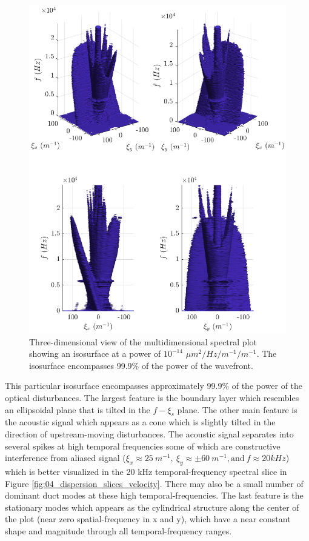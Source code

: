 \begin{figure}
  \centering
  \includegraphics{../matlab/04_dispersion_analysis/dispersion_3d.eps}
  \caption{Three-dimensional view of the multidimensional spectral plot showing an isosurface at a power of $10^{-14}$ $\mu m^2/Hz/m^{-1}/m^{-1}$. The isosurface encompasses 99.9\% of the power of the wavefront.}
  \label{fig:04_dispersion_3d}
\end{figure}
This particular isosurface encompasses approximately 99.9\% of the power of the optical disturbances.
The largest feature is the boundary layer which resembles an ellipsoidal plane that is tilted in the $f-\xi_s$ plane.
The other main feature is the acoustic signal which appears as a cone which is slightly tilted in the direction of upstream-moving disturbances.
The acoustic signal separates into several spikes at high temporal frequencies some of which are constructive interference from aliased signal ($\xi_x\approx25\ m^{-1},\ \xi_y\approx\pm60\ m^{-1}, \textrm{and}\ f\approx20 kHz$) which is better visualized in the 20 kHz temporal-frequency spectral slice in Figure \ref{fig:04_dispersion_slices_velocity}.
There may also be a small number of dominant duct modes at these high temporal-frequencies.
The last feature is the stationary modes which appears as the cylindrical structure along the center of the plot (near zero spatial-frequency in x and y), which have a near constant shape and magnitude through all temporal-frequency ranges.

